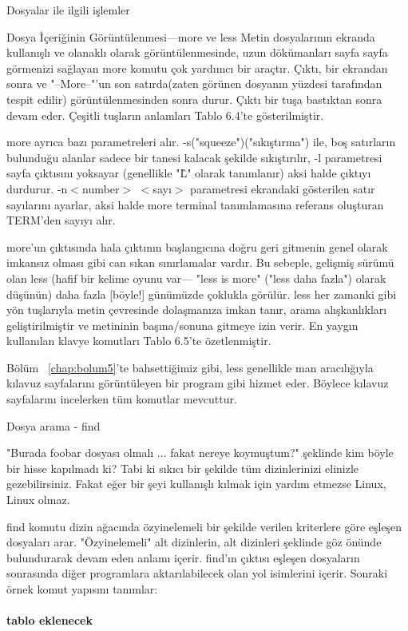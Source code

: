 \begin{section}{Dosyalar ile ilgili işlemler}
\begin{subsection}{Dosya İçeriğinin Görüntülenmesi—more ve less}
Metin dosyalarının ekranda kullanışlı ve olanaklı olarak görüntülenmesinde, uzun dökümanları sayfa sayfa görmenizi sağlayan more komutu çok yardımcı bir araçtır. Çıktı, bir ekrandan sonra ve "--More--"'un son satırda(zaten görünen dosyanın yüzdesi tarafından tespit edilir) görüntülenmesinden sonra durur. Çıktı bir tuşa bastıktan sonra devam eder. Çeşitli tuşların anlamları Tablo 6.4'te gösterilmiştir.

more ayrıca bazı parametreleri alır. -s("squeeze")("sıkıştırma") ile, boş satırların bulunduğu alanlar sadece bir tanesi kalacak şekilde sıkıştırılır, -l parametresi sayfa çıktısını yoksayar (genellikle "\^L" olarak tanımlanır) aksi halde çıktıyı durdurur. -n$<$number$>$ $<$sayı$>$ parametresi ekrandaki gösterilen satır sayılarını ayarlar, aksi halde more terminal tanımlamasına referans oluşturan TERM'den sayıyı alır.

more'un çıktısında hala çıktının başlangıcına doğru geri gitmenin genel olarak imkansız olması gibi can sıkan sınırlamalar vardır. Bu sebeple, gelişmiş sürümü olan less (hafif bir kelime oyunu var— "less is more" ("less daha fazla") olarak düşünün) daha fazla [böyle!] günümüzde çoklukla görülür. less her zamanki gibi yön tuşlarıyla metin çevresinde dolaşmanıza imkan tanır, arama alışkanlıkları geliştirilmiştir ve metininin başına/sonuna gitmeye izin verir. En yaygın kullanılan klavye komutları Tablo 6.5'te özetlenmiştir.

Bölüm ~\ref{chap:bolum5}'te bahsettiğimiz gibi, less genellikle man aracılığıyla kılavuz sayfalarını görüntüleyen bir program gibi hizmet eder. Böylece kılavuz sayfalarını incelerken tüm komutlar mevcuttur.
\end{subsection}
\begin{subsection}{Dosya arama - find}

"Burada foobar dosyası olmalı ... fakat nereye koymuştum?" şeklinde kim böyle bir hisse kapılmadı ki? Tabi ki sıkıcı bir şekilde tüm dizinlerinizi elinizle gezebilirsiniz. Fakat eğer bir şeyi kullanışlı kılmak için yardım etmezse Linux, Linux olmaz.

find komutu dizin ağacında özyinelemeli bir şekilde verilen kriterlere göre eşleşen dosyaları arar. "Özyinelemeli" alt dizinlerin, alt dizinleri şeklinde göz önünde bulundurarak devam eden anlamı içerir. find'ın çıktısı eşleşen dosyaların sonrasında diğer programlara aktarılabilecek olan yol isimlerini içerir. Sonraki örnek komut yapısını tanımlar:

\paragraph{tablo eklenecek}{}


\end{subsection}
\end{section}
